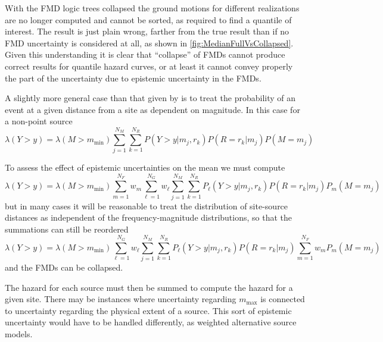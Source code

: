 \documentclass{article}
\begin{document}
With the FMD logic trees collapsed the ground motions for different realizations are no longer computed and cannot be sorted, as required to find a quantile of interest. 
The result is just plain wrong, farther from the true result than if no FMD uncertainty is considered at all, as shown in \autoref{fig:MedianFullVsCollapsed}.
Given this understanding it is clear that ``collapse'' of FMDs cannot produce correct results for quantile hazard curves, or at least it cannot convey properly the part of the uncertainty due to epistemic uncertainty in the FMDs.

A slightly more general case than that given by \cite{baker2008introduction} is to treat the probability of an event at a given distance from a site as dependent on magnitude. In this case for a non-point source \citep[equation~A2]{field2003opensha}
$$ 
\lambda(Y > y) = 
\lambda(M > m_\text{min}) 
\sum_{j=1}^{N_M} 
\sum_{k=1}^{N_R} 
P(Y > y | m_j,r_k) 
P(R=r_k | m_j)
P(M=m_j) 
$$ 

To assess the effect of epistemic uncertainties on the mean we must compute
\begin{equation} \label{eq:NonPointPreCollapse} 
\lambda(Y > y) = 
\lambda(M > m_\text{min}) 
\sum_{m=1}^{N_F} w_m 
\sum_{\ell=1}^{N_G} w_\ell 
\sum_{j=1}^{N_M} 
\sum_{k=1}^{N_R} 
P_\ell(Y > y | m_j,r_k) 
P(R=r_k | m_j)
P_m(M=m_j) 
\end{equation} 
but in many cases it will be reasonable to treat the distribution of site-source distances as independent of the frequency-magnitude distributions, so that the summations can still be reordered  
$$ 
\lambda(Y > y) = 
\lambda(M > m_\text{min}) 
\sum_{\ell=1}^{N_G} w_\ell 
\sum_{j=1}^{N_M} 
\sum_{k=1}^{N_R} 
P_\ell(Y > y | m_j,r_k) 
P(R=r_k | m_j)
\sum_{m=1}^{N_F} w_m 
P_m(M=m_j) 
$$ 
and the FMDs can be collapsed.

The hazard for each source must then be summed to compute the hazard for a given site. There may be instances where uncertainty regarding $m_\text{max}$ is connected to uncertainty regarding the physical extent of a source. This sort of epistemic uncertainty would have to be handled differently, as weighted alternative source models.
\end{document}
